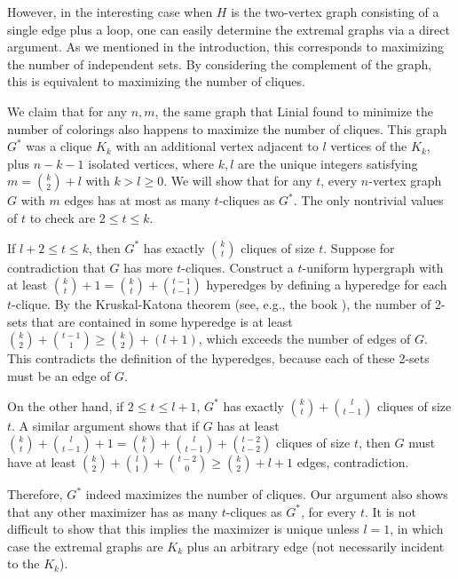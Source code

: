 \documentclass[11pt]{article}
\begin{document}
\begin{itemize}
  However, in the interesting case when $H$ is the two-vertex graph
  consisting of a single edge plus a loop, one can easily determine
  the extremal graphs via a direct argument.  As we mentioned in the
  introduction, this corresponds to maximizing the number of
  independent sets.  By considering the complement of the graph, this
  is equivalent to maximizing the number of cliques.

  We claim that for any $n,m$, the same graph that Linial found to
  minimize the number of colorings also happens to maximize the number
  of cliques.  This graph $G^*$ was a clique $K_k$ with an additional
  vertex adjacent to $l$ vertices of the $K_k$, plus $n-k-1$ isolated
  vertices, where $k,l$ are the unique integers satisfying $m = {k
    \choose 2} + l$ with $k > l \geq 0$.  We will show that for any
  $t$, every $n$-vertex graph $G$ with $m$ edges has at most as many
  $t$-cliques as $G^*$.  The only nontrivial values of $t$ to check
  are $2 \leq t \leq k$.

  If $l+2 \leq t \leq k$, then $G^*$ has exactly ${k \choose t}$
  cliques of size $t$.  Suppose for contradiction that $G$ has more
  $t$-cliques.  Construct a $t$-uniform hypergraph with at least ${k
    \choose t} + 1 = {k \choose t} + {t-1 \choose t-1}$ hyperedges by
  defining a hyperedge for each $t$-clique.  By the Kruskal-Katona
  theorem (see, e.g., the book \cite{Kruskal-Katona}), the number of
  2-sets that are contained in some hyperedge is at least ${k \choose
    2} + {t-1 \choose 1} \geq {k \choose 2} + (l+1)$, which exceeds
  the number of edges of $G$.  This contradicts the definition of the
  hyperedges, because each of these 2-sets must be an edge of $G$.

  On the other hand, if $2 \leq t \leq l+1$, $G^*$ has exactly ${k
    \choose t} + {l \choose t-1}$ cliques of size $t$.  A similar
  argument shows that if $G$ has at least ${k \choose t} + {l \choose
    t-1} + 1 = {k \choose t} + {l \choose t-1} + {t-2 \choose t-2}$
  cliques of size $t$, then $G$ must have at least ${k \choose 2} + {l
    \choose 1} + {t-2 \choose 0} \geq {k \choose 2} + l + 1$ edges,
  contradiction.

  Therefore, $G^*$ indeed maximizes the number of cliques.  Our
  argument also shows that any other maximizer has as many $t$-cliques
  as $G^*$, for every $t$.  It is not difficult to show that this
  implies the maximizer is unique unless $l = 1$, in which case the
  extremal graphs are $K_k$ plus an arbitrary edge (not necessarily
  incident to the $K_k$).




\end{itemize}
\end{document}

